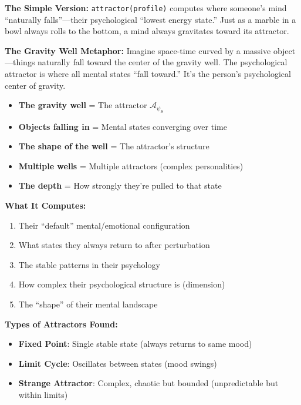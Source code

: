 \documentclass[11pt,twoside]{book}
\newcommand{\PsychAttractor}{\mathcal{A}_\psi}
\begin{document}
\begin{tcolorbox}[colback=green!5!white,colframe=green!65!black,title=\textbf{Plain English: The ``Psychological Gravity Map''},breakable]

\textbf{The Simple Version:}
\texttt{attractor(profile)} computes where someone's mind ``naturally falls''---their
psychological ``lowest energy state.'' Just as a marble in a bowl always rolls to the
bottom, a mind always gravitates toward its attractor.

\textbf{The Gravity Well Metaphor:}
Imagine space-time curved by a massive object---things naturally fall toward the center
of the gravity well. The psychological attractor is where all mental states ``fall toward.''
It's the person's psychological center of gravity.

\begin{itemize}
    \item \textbf{The gravity well} = The attractor $\PsychAttractor_S$
    \item \textbf{Objects falling in} = Mental states converging over time
    \item \textbf{The shape of the well} = The attractor's structure
    \item \textbf{Multiple wells} = Multiple attractors (complex personalities)
    \item \textbf{The depth} = How strongly they're pulled to that state
\end{itemize}

\textbf{What It Computes:}
\begin{enumerate}
    \item Their ``default'' mental/emotional configuration
    \item What states they always return to after perturbation
    \item The stable patterns in their psychology
    \item How complex their psychological structure is (dimension)
    \item The ``shape'' of their mental landscape
\end{enumerate}

\textbf{Types of Attractors Found:}
\begin{itemize}
    \item \textbf{Fixed Point}: Single stable state (always returns to same mood)
    \item \textbf{Limit Cycle}: Oscillates between states (mood swings)
    \item \textbf{Strange Attractor}: Complex, chaotic but bounded (unpredictable but within limits)
\end{itemize}

\end{tcolorbox}
\end{document}

